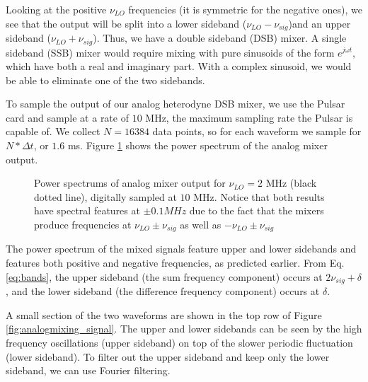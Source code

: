 \documentclass[12pt]{article}
\begin{document}
Looking at the positive $\nu_{LO}$ frequencies (it is symmetric for the negative ones), we see that the output will be split into a lower sideband ($\nu_{LO} - \nu_{sig}$)and an upper sideband ($\nu_{LO} + \nu_{sig}$). Thus, we have a double sideband (DSB) mixer. A single sideband (SSB) mixer would require mixing with pure sinusoids of the form $e^{j\omega t}$, which have both a real and imaginary part. With a complex sinusoid, we would be able to eliminate one of the two sidebands.

To sample the output of our analog heterodyne DSB mixer, we use the Pulsar card and sample at a rate of $10$ MHz, the maximum sampling rate the Pulsar is capable of. We collect $N=16384$ data points, so for each waveform we sample for $N*\Delta{t}$, or $1.6$ ms. Figure \ref{fig:analogmixing_spectrum} shows the power spectrum of the analog mixer output.

\begin{figure}[H]
\caption[SODUMB]{Power spectrums of analog mixer output for $\nu_{LO}=2$ MHz (black dotted line), digitally sampled at $10$ MHz. Notice that both results have spectral features at $\pm 0.1 MHz$ due to the fact that the mixers produce frequencies at $\nu_{LO} \pm \nu_{sig}$ as well as $-\nu_{LO} \pm \nu_{sig}$}
\label{fig:analogmixing_spectrum}
\end{figure}

The power spectrum of the mixed signals feature upper and lower sidebands and features both positive and negative frequencies, as predicted earlier. From Eq. \ref{eq:bands}, the upper sideband (the sum frequency component) occurs at $2\nu_{sig} + \delta$, and the lower sideband (the difference frequency component) occurs at $\delta$.

A small section of the two waveforms are shown in the top row of Figure \ref{fig:analogmixing_signal}. The upper and lower sidebands can be seen by the high frequency oscillations (upper sideband) on top of the slower periodic fluctuation (lower sideband). To filter out the upper sideband and keep only the lower sideband, we can use Fourier filtering.
\end{document}

